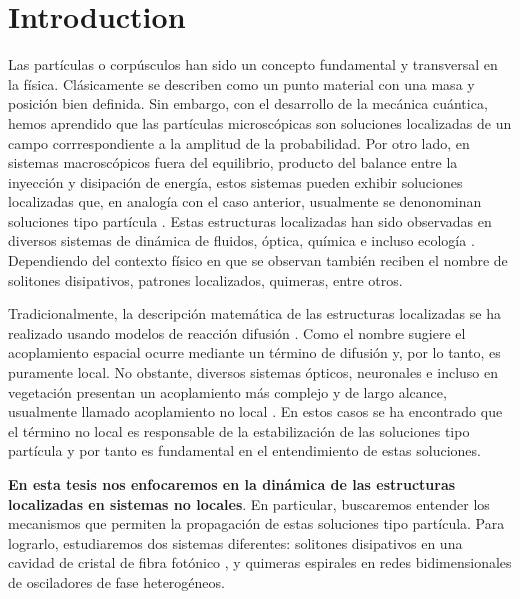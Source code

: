 \chapter{Introduction}
Las partículas o corpúsculos han sido un concepto fundamental y transversal en la física. Clásicamente se describen como un punto material con una masa y posición bien definida. Sin embargo, con el desarrollo de la mecánica cuántica, hemos aprendido que las partículas microscópicas son soluciones localizadas de un campo corrrespondiente a la amplitud de la probabilidad. Por otro lado, en sistemas macroscópicos fuera del equilibrio, producto del balance entre la inyección y disipación de energía, estos sistemas pueden exhibir soluciones localizadas que, en analogía con el caso anterior, usualmente se denonominan soluciones tipo partícula \cite{LS:b}. Estas estructuras localizadas han sido observadas en diversos sistemas de dinámica de fluidos, óptica, química e incluso ecología \cite{LS:a, LS:b}. Dependiendo del contexto físico en que se observan también reciben el nombre de solitones disipativos, patrones localizados, quimeras, entre otros. 

Tradicionalmente, la descripción matemática de las estructuras localizadas se ha realizado usando modelos de reacción difusión \cite{RD:VanagEpstein, RD:Winfree, RD:Barkley}. Como el nombre sugiere el acoplamiento espacial ocurre mediante un término de difusión y, por lo tanto, es puramente local. No obstante, diversos sistemas ópticos, neuronales e incluso en vegetación presentan un acoplamiento más complejo y de largo alcance, usualmente llamado acoplamiento no local \cite{NonLocal:Optics, NonLocal:Neuron, NonLocal:Vegetation}. En estos casos se ha encontrado que el término no local es responsable de la estabilización de las soluciones tipo partícula \cite{NonLocal:Stabilize, Raman:Stabilize} y por tanto es fundamental en el entendimiento de estas soluciones.


{\bf En esta tesis nos enfocaremos en la dinámica de las estructuras localizadas en sistemas no locales}. En particular, buscaremos entender los mecanismos que permiten la propagación de estas soluciones tipo partícula. Para lograrlo, estudiaremos dos sistemas diferentes: solitones disipativos en una cavidad de cristal de fibra fotónico \cite{Raman:Agrawal}, y quimeras espirales en redes bidimensionales de osciladores de fase heterogéneos. 

